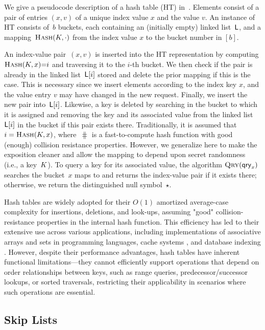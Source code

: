 We give a pseudocode description of a hash table (HT) in~. Elements consist of a pair of entries $(x,v)$ of a unique index value $x$ and the value $v$. An instance of HT consists of~$b$ buckets, each containing an (initially empty) linked list~$\mathsf{L}$, and a mapping~$\textnormal{\textsc{Hash}}(K,\cdot)$ from the index value $x$ to the bucket number in $[b]$. 

An index-value pair~$(x,v)$ is inserted into the HT representation by computing $\textnormal{\textsc{Hash}}(K,x){=} i$ and traversing it to the $i$-th bucket. We then check if the pair is already in the linked list~$\mathsf{L}[i]$ stored and delete the prior mapping if this is the case. This is necessary since we insert elements according to the index key $x$, and the value entry $v$ may have changed in the new request. Finally, we insert the new pair into~$\mathsf{L}[i]$. Likewise, a key is deleted by searching in the bucket to which it is assigned and removing the key and its associated value from the linked list~$\mathsf{L}[i]$ in the bucket if this pair exists there. Traditionally, it is assumed that $i = \textnormal{\textsc{Hash}}(K,x)$, where~$\hash$ is a fast-to-compute hash function with good (enough) collision resistance properties. However, we generalize here to make the exposition cleaner and allow the mapping to depend upon secret randomness (i.e., a key~$K$). To query a key for its associated value, the algorithm $\textnormal{\textsc{Qry}}(\mathsf{qry}_x)$ searches the bucket~$x$ maps to and returns the index-value pair if it exists there; otherwise, we return the distinguished null symbol~$\star$.

Hash tables are widely adopted for their $O(1)$ amortized average-case complexity for insertions, deletions, and look-ups, assuming "good" collision-resistance properties in the internal hash function. This efficiency has led to their extensive use across various applications, including implementations of associative arrays \cite{mehlhorn2008hash} and sets \cite{blandy2021programming} in programming languages, cache systems \cite{istvan2015hash}, and database indexing \cite{zobel2001memory}. However, despite their performance advantages, hash tables have inherent functional limitations—they cannot efficiently support operations that depend on order relationships between keys, such as range queries, predecessor/successor lookups, or sorted traversals, restricting their applicability in scenarios where such operations are essential.

\subsection{Skip Lists}
\label{prelim:sl}

